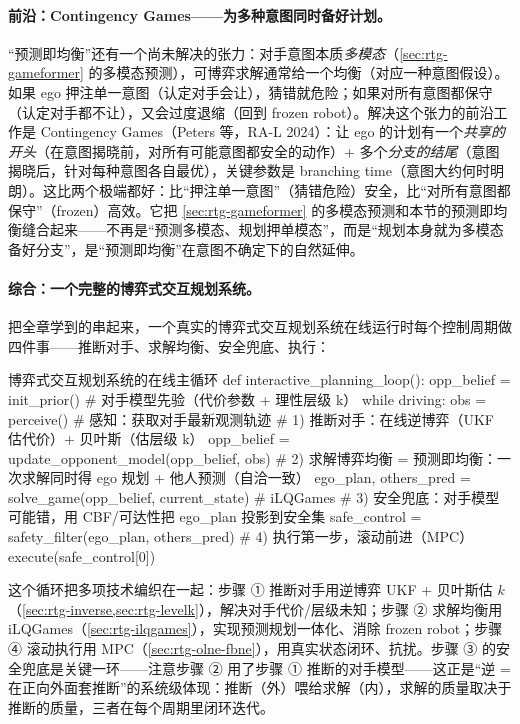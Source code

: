 \paragraph{前沿：Contingency Games——为多种意图同时备好计划。}
“预测即均衡”还有一个尚未解决的张力：对手意图本质\emph{多模态}（\cref{sec:rtg-gameformer} 的多模态预测），可博弈求解通常给一个均衡（对应一种意图假设）。如果 ego 押注单一意图（认定对手会让），猜错就危险；如果对所有意图都保守（认定对手都不让），又会过度退缩（回到 frozen robot）。解决这个张力的前沿工作是 Contingency Games（Peters 等，RA-L 2024）\cite{peters2024contingency}：让 ego 的计划有一个\emph{共享的开头}（在意图揭晓前，对所有可能意图都安全的动作）+ 多个\emph{分支的结尾}（意图揭晓后，针对每种意图各自最优），关键参数是 branching time（意图大约何时明朗）。这比两个极端都好：比“押注单一意图”（猜错危险）安全，比“对所有意图都保守”（frozen）高效。它把 \cref{sec:rtg-gameformer} 的多模态预测和本节的预测即均衡缝合起来——不再是“预测多模态、规划押单模态”，而是“规划本身就为多模态备好分支”，是“预测即均衡”在意图不确定下的自然延伸。

\paragraph{综合：一个完整的博弈式交互规划系统。}
把全章学到的串起来，一个真实的博弈式交互规划系统在线运行时每个控制周期做四件事——推断对手、求解均衡、安全兜底、执行：

\begin{codebox}[Python]{博弈式交互规划系统的在线主循环}
def interactive_planning_loop():
    opp_belief = init_prior()              # 对手模型先验（代价参数 + 理性层级 k）
    while driving:
        obs = perceive()                   # 感知：获取对手最新观测轨迹
        # 1) 推断对手：在线逆博弈（UKF 估代价）+ 贝叶斯（估层级 k）
        opp_belief = update_opponent_model(opp_belief, obs)
        # 2) 求解博弈均衡 = 预测即均衡：一次求解同时得 ego 规划 + 他人预测（自洽一致）
        ego_plan, others_pred = solve_game(opp_belief, current_state)   # iLQGames
        # 3) 安全兜底：对手模型可能错，用 CBF/可达性把 ego_plan 投影到安全集
        safe_control = safety_filter(ego_plan, others_pred)
        # 4) 执行第一步，滚动前进（MPC）
        execute(safe_control[0])
\end{codebox}

\noindent 这个循环把多项技术编织在一起：步骤 ① 推断对手用逆博弈 UKF + 贝叶斯估 $k$（\cref{sec:rtg-inverse,sec:rtg-levelk}），解决对手代价/层级未知；步骤 ② 求解均衡用 iLQGames（\cref{sec:rtg-ilqgames}），实现预测规划一体化、消除 frozen robot；步骤 ④ 滚动执行用 MPC（\cref{sec:rtg-olne-fbne}），用真实状态闭环、抗扰。步骤 ③ 的安全兜底是关键一环——注意步骤 ② 用了步骤 ① 推断的对手模型——这正是“逆 = 在正向外面套推断”的系统级体现：推断（外）喂给求解（内），求解的质量取决于推断的质量，三者在每个周期里闭环迭代。

